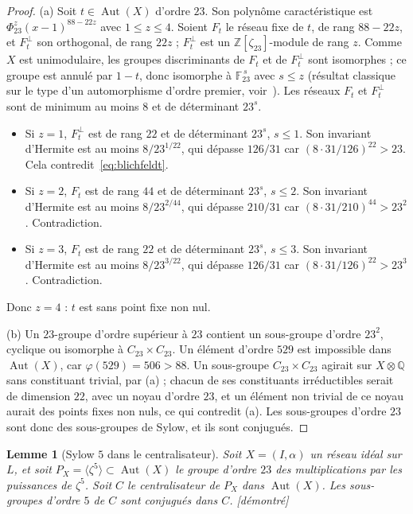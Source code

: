 \documentclass[11pt,a4paper]{amsart}
\theoremstyle{plain}
\newtheorem{lemme}[theoreme]{Lemme}
\theoremstyle{definition}
\numberwithin{equation}{section}
\newcommand{\Q}{\mathbb{Q}}
\newcommand{\Z}{\mathbb{Z}}
\newcommand{\F}{\mathbb{F}}
\DeclareMathOperator{\Aut}{Aut}
\newcommand{\st}[1]{\textup{\textsf{\small[#1]}}}
\newcommand{\DEM}{\st{démontré}}
\begin{document}
\begin{proof}
(a) Soit $t\in\Aut(X)$ d'ordre $23$. Son polynôme caractéristique est $\Phi_{23}^{z}(x-1)^{88-22z}$ avec $1\le z\le4$. Soient $F_t$ le réseau fixe de $t$, de rang $88-22z$, et $F_t^\perp$ son orthogonal, de rang $22z$ ; $F_t^\perp$ est un $\Z[\zeta_{23}]$-module de rang $z$. Comme $X$ est unimodulaire, les groupes discriminants de $F_t$ et de $F_t^\perp$ sont isomorphes ; ce groupe est annulé par $1-t$, donc isomorphe à $\F_{23}^{\,s}$ avec $s\le z$ (résultat classique sur le type d'un automorphisme d'ordre premier, voir~\cite{Neb13}). Les réseaux $F_t$ et $F_t^\perp$ sont de minimum au moins $8$ et de déterminant $23^s$.
\begin{itemize}
\item Si $z=1$, $F_t^\perp$ est de rang $22$ et de déterminant $23^s$, $s\le1$. Son invariant d'Hermite est au moins $8/23^{1/22}$, qui dépasse $126/31$ car $(8\cdot31/126)^{22}>23$. Cela contredit~\eqref{eq:blichfeldt}.
\item Si $z=2$, $F_t$ est de rang $44$ et de déterminant $23^s$, $s\le2$. Son invariant d'Hermite est au moins $8/23^{2/44}$, qui dépasse $210/31$ car $(8\cdot31/210)^{44}>23^2$. Contradiction.
\item Si $z=3$, $F_t$ est de rang $22$ et de déterminant $23^s$, $s\le3$. Son invariant d'Hermite est au moins $8/23^{3/22}$, qui dépasse $126/31$ car $(8\cdot31/126)^{22}>23^3$. Contradiction.
\end{itemize}
Donc $z=4$ : $t$ est sans point fixe non nul.

(b) Un $23$-groupe d'ordre supérieur à $23$ contient un sous-groupe d'ordre $23^2$, cyclique ou isomorphe à $C_{23}\times C_{23}$. Un élément d'ordre $529$ est impossible dans $\Aut(X)$, car $\varphi(529)=506>88$. Un sous-groupe $C_{23}\times C_{23}$ agirait sur $X\otimes\Q$ sans constituant trivial, par (a) ; chacun de ses constituants irréductibles serait de dimension $22$, avec un noyau d'ordre $23$, et un élément non trivial de ce noyau aurait des points fixes non nuls, ce qui contredit (a). Les sous-groupes d'ordre $23$ sont donc des sous-groupes de Sylow, et ils sont conjugués.
\end{proof}

\begin{lemme}[Sylow $5$ dans le centralisateur]\label{lem:syl5}
Soit $X=(I,\alpha)$ un réseau idéal sur $L$, et soit $P_X=\langle\zeta^5\rangle\subset\Aut(X)$ le groupe d'ordre $23$ des multiplications par les puissances de $\zeta^5$. Soit $C$ le centralisateur de $P_X$ dans $\Aut(X)$. Les sous-groupes d'ordre $5$ de $C$ sont conjugués dans $C$. \DEM
\end{lemme}
\end{document}
